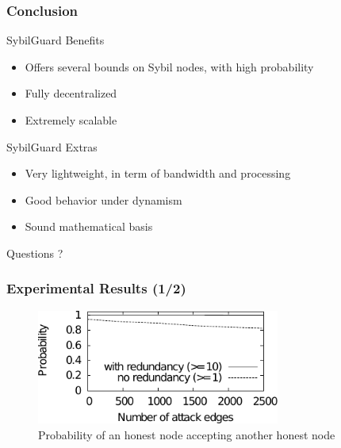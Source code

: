 \documentclass{beamer}
\begin{document}

\begin{frame}

  \frametitle{Conclusion}

  \begin{block}{SybilGuard Benefits}
    \begin{itemize}
    \item Offers several bounds on Sybil nodes, with high probability
    \item Fully decentralized 
    \item Extremely scalable
    \end{itemize}
  \end{block}

  \begin{block}{SybilGuard Extras}
    \begin{itemize}
    \item Very lightweight, in term of bandwidth and processing
    \item Good behavior under dynamism
    \item Sound mathematical basis
    \end{itemize}
  \end{block}

\end{frame}


\begin{frame}

  \begin{center}
    \Huge{Questions ?}
  \end{center}

\end{frame}


\begin{frame}

  \frametitle{Experimental Results (1/2)}

  \begin{figure}
    \includegraphics[width=8cm]{./pictures/result_honest_node} 
    \caption{Probability of an honest node accepting another honest node}
  \end{figure}

\end{frame}
\end{document}

